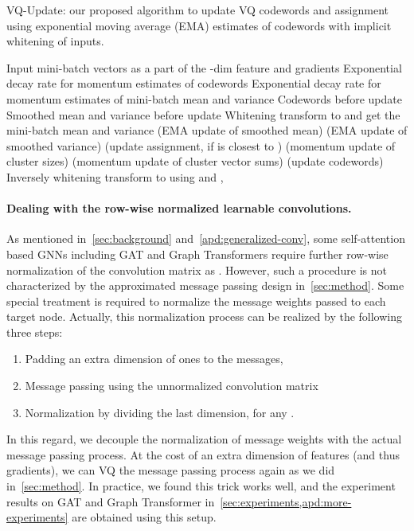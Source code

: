 \documentclass{article}
\newcommand{\cm}{\paragraph}
\begin{document}
\begin{algorithm}[ht]
\caption{\label{alg:vq-update}VQ-Update: our proposed algorithm to update VQ codewords and assignment using exponential moving average (EMA) estimates of codewords with implicit whitening of inputs.}
\begin{algorithmic}[1]
    \Require Input mini-batch vectors  as a part of the -dim feature and gradients
    \Require Exponential decay rate  for momentum estimates of codewords
    \Require Exponential decay rate  for momentum estimates of mini-batch mean and variance
    \Require Codewords  before update
    \Require Smoothed mean  and variance  before update
     
        \State Whitening transform  to  and get the mini-batch mean  and variance 
        \State  (EMA update of smoothed mean)
        \State  (EMA update of smoothed variance)
        \State  {} (update assignment,  if  is closest to )
        \State  (momentum update of cluster sizes)
        \State  (momentum update of cluster vector sums)
        \State  (update codewords)
        \State Inversely whitening transform  to  using  and 
        \State \Return , 
    \EndFunction
\end{algorithmic}
\end{algorithm}

\cm{Dealing with the row-wise normalized learnable convolutions.}
As mentioned in~\cref{sec:background} and~\cref{apd:generalized-conv}, some self-attention based GNNs including GAT and Graph Transformers require further row-wise normalization of the convolution matrix as . However, such a procedure is not characterized by the approximated message passing design in~\cref{sec:method}. Some special treatment is required to normalize the message weights passed to each target node. Actually, this normalization process can be realized by the following three steps:
\begin{enumerate}[leftmargin=*, noitemsep, topsep=0pt]
    \item Padding an extra dimension of ones to the messages, 
    \item Message passing using the unnormalized convolution matrix
    \item Normalization by dividing the last dimension,  for any .
\end{enumerate}
In this regard, we decouple the normalization of message weights with the actual message passing process. At the cost of an extra dimension of features (and thus gradients), we can VQ the message passing process again as we did in~\cref{sec:method}. In practice, we found this trick works well, and the experiment results on GAT and Graph Transformer in~\cref{sec:experiments,apd:more-experiments} are obtained using this setup.
\end{document}
